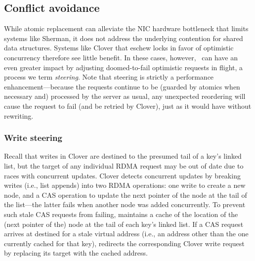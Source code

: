 
\subsection{Conflict avoidance}
\label{ca}

While atomic replacement can alleviate the NIC hardware bottleneck
that limits systems like Sherman, it does not address the underlying
contention for shared data structures.  Systems like Clover that
eschew locks in favor of optimistic concurrency therefore see little
benefit.  In these cases, however, \sword\ can have an even greater
impact by adjusting doomed-to-fail optimistic requests in flight, a process we term \emph{steering}.
%
Note that steering is strictly a performance
enhancement---because the requests continue to be (guarded by atomics
when necessary and) processed by the server as usual, any unexpected
reordering will cause the request to fail (and be retried by Clover),
just as it would have without rewriting.


\subsubsection{Write steering}

Recall that writes in Clover are destined to the presumed tail of a
key's linked list, but the target of any individual RDMA request may
be out of date due to races with concurrent updates.  Clover detects
concurrent updates by breaking writes (i.e., list appends) into two
RDMA operations: one write to create a new node, and a CAS operation
to update the next pointer of the node at the tail of the list---the
latter fails when another node was added concurrently.  To prevent
such stale CAS requests from failing, {\sword} maintains a cache of
the location of the (next pointer of the) node at the tail of each
key's linked list. If a CAS request arrives at {\sword} destined for a
stale virtual address (i.e., an address other than the one currently
cached for that key), {\sword} redirects the corresponding Clover
write request by replacing its target with the cached address.

